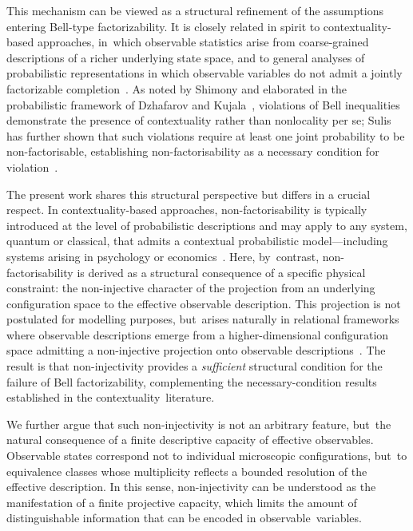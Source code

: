 \documentclass[11pt,a4paper]{article}
\theoremstyle{remark}
\begin{document}
    This mechanism can be viewed as a structural refinement of the assumptions entering
    Bell-type factorizability.
    It is closely related in spirit to contextuality-based approaches, in~which observable
    statistics arise from coarse-grained descriptions of a richer underlying state space,
    and to general analyses of probabilistic representations in which observable variables
    do not admit a jointly factorizable completion~\cite{Dzhafarov2017,AbramskyBrandenburger2011,Amaral2018}.
    As noted by Shimony and elaborated in the probabilistic framework of Dzhafarov and
    Kujala~\cite{Dzhafarov2017}, violations of Bell inequalities demonstrate the presence
    of contextuality rather than nonlocality per se; Sulis has further shown that such
    violations require at least one joint probability to be non-factorisable, establishing
    non-factorisability as a necessary condition for violation~\cite{Sulis2025}.

    The present work shares this structural perspective but differs in a crucial respect.
    In contextuality-based approaches, non-factorisability is typically introduced at the
    level of probabilistic descriptions and may apply to any system, quantum or classical,
    that admits a contextual probabilistic model---including systems arising in psychology
    or economics~\cite{Haven2014,Sulis2025}.
    Here, by~contrast, non-factorisability is derived as a structural consequence of a
    specific physical constraint: the non-injective character of the projection from an
    underlying configuration space to the effective observable description.
    This projection is not postulated for modelling purposes, but~arises naturally in
    relational frameworks where observable descriptions emerge from a higher-dimensional
    configuration space admitting a non-injective projection
    onto observable descriptions~\cite{Beau2026a}.
    The result is that non-injectivity provides a \emph{sufficient} structural condition
    for the failure of Bell factorizability, complementing the necessary-condition results
    established in the contextuality~literature.

    We further argue that such non-injectivity is not an arbitrary feature, but~the natural
    consequence of a finite descriptive capacity of effective observables.
    Observable states correspond not to individual microscopic configurations, but~to
    equivalence classes whose multiplicity reflects a bounded resolution of the effective
    description.
    In this sense, non-injectivity can be understood as the manifestation of a finite
    projective capacity, which limits the amount of distinguishable information that can
    be encoded in observable~variables.
\end{document}
